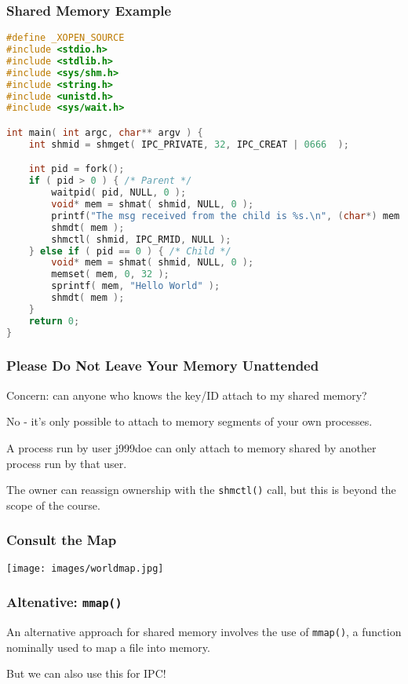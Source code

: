 \begin{frame}[fragile]
	\frametitle{Shared Memory Example}
	\begin{lstlisting}[language=C]
#define _XOPEN_SOURCE
#include <stdio.h>
#include <stdlib.h>
#include <sys/shm.h>
#include <string.h>
#include <unistd.h>
#include <sys/wait.h>

int main( int argc, char** argv ) { 
    int shmid = shmget( IPC_PRIVATE, 32, IPC_CREAT | 0666  );  

    int pid = fork();
    if ( pid > 0 ) { /* Parent */
        waitpid( pid, NULL, 0 );
        void* mem = shmat( shmid, NULL, 0 );
        printf("The msg received from the child is %s.\n", (char*) mem );
        shmdt( mem );
        shmctl( shmid, IPC_RMID, NULL );
    } else if ( pid == 0 ) { /* Child */
        void* mem = shmat( shmid, NULL, 0 );
        memset( mem, 0, 32 );
        sprintf( mem, "Hello World" );
        shmdt( mem );
    }   
    return 0;
}
\end{lstlisting}

\end{frame}

\begin{frame}
	\frametitle{Please Do Not Leave Your Memory Unattended}
	
	Concern: can anyone who knows the key/ID attach to my shared memory?
	
    No - it's only possible to attach to memory segments of your own processes. 
	
    A process run by user j999doe can only attach to memory shared by another process run by that user.

	
    The owner can reassign ownership with the \texttt{shmctl()} call, but this is beyond the scope of the course.
	
\end{frame}

\begin{frame}
	\frametitle{Consult the Map}

	\begin{center}
		\texttt{[image: images/worldmap.jpg]}
	\end{center}


\end{frame}


\begin{frame}
	\frametitle{Altenative: \texttt{mmap()}}

	An alternative approach for shared memory involves the use of \texttt{mmap()}, a function nominally used to map a file into memory.

	But we can also use this for IPC!

\end{frame}


